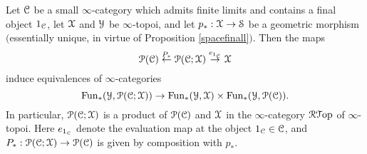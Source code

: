 \begin{lemma}\label{goldenrod}
Let $\calC$ be a small $\infty$-category which admits finite limits and contains
a final object $1_{\calC}$, let $\calX$ and $\calY$ be $\infty$-topoi, and let 
$p_{\ast}: \calX \rightarrow \SSet$ be a geometric morphism $($essentially unique, in virtue of Proposition \ref{spacefinall}{}$)$. Then the maps 
$$ \calP(\calC) \stackrel{P_{\ast}}{\leftarrow} \calP(\calC; \calX) \stackrel{e_{1_{\calC}}}{\rightarrow} \calX$$
induce equivalences of $\infty$-categories
$$ \Fun_{\ast}( \calY, \calP(\calC; \calX)) \rightarrow \Fun_{\ast}(\calY, \calX) \times \Fun_{\ast}(\calY, \calP(\calC)).$$
In particular, $\calP(\calC; \calX)$ is a product of $\calP(\calC)$ and $\calX$ in the 
$\infty$-category $\RGeom$ of $\infty$-topoi.
Here $e_{1_{\calC}}$ denote the evaluation map at the object $1_{\calC} \in \calC$, 
and $P_{\ast}: \calP(\calC; \calX) \rightarrow \calP(\calC)$ is given by composition with
$p_{\ast}$. 
\end{lemma}

